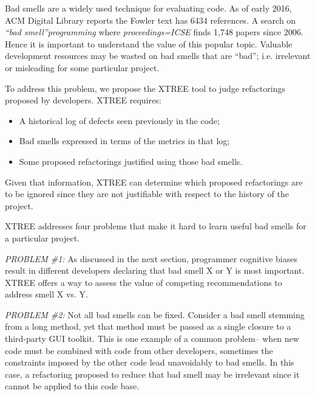 \documentclass{sig-alternate}
\theoremstyle{break}
\begin{document}
Bad smells are a widely used technique for evaluating code. As of  early 2016, ACM Digital Library reports 
the Fowler text has 6434 references. A search  on {\em ``bad smell''programming} 
where {\em proceedings=ICSE} finds 1,748 papers since 2006.
Hence it is important to understand the value of
this popular topic.  
Valuable development resources may be wasted on bad smells that are ``bad''; i.e. 
 irrelevant or misleading
for some particular project.

To address this problem, we propose the XTREE
tool to judge refactorings
proposed by developers.
  XTREE requires:
     \begin{itemize}
         \item A historical log of defects seen previously in the code;
         \item  Bad smells expressed in terms of the 
          metrics   in that log;
         \item Some proposed refactorings justified using those bad smells.
     \end{itemize}
Given that information,  XTREE can determine which
  proposed refactorings are to be ignored
since they are not justifiable  
with respect to the history of the project.


XTREE addresses four problems that  make it hard to  learn useful
bad smells for a particular project.

{\em PROBLEM \#1:} As discussed in the next section, programmer
   cognitive biases result in different
developers declaring that
bad smell X or Y is most important. 
 XTREE offers a way to assess the value of competing recommendations to address smell X vs. Y.
  

{\em PROBLEM \#2:} Not all bad smells can be fixed. 
Consider
a bad smell stemming from a long method,
yet that method must be passed as a single closure
to a third-party GUI toolkit.  This is one
example of a common problem-- when new code must
be combined with code from other developers,
sometimes the constraints imposed by the other code
lead unavoidably to bad smells. In this case,
a refactoring proposed to reduce that bad smell
may be irrelevant since it cannot be applied to this code base.
\end{document}
